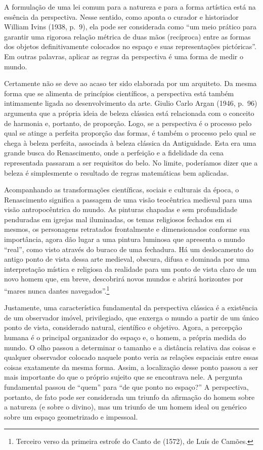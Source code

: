 A formulação de uma lei comum para a natureza e para a forma artística
está na essência da perspectiva. Nesse sentido, como aponta o curador e
historiador William Ivins (1938, p.~9), ela pode ser considerada como
``um meio prático para garantir uma rigorosa relação métrica de duas
mãos (recíproca) entre as formas dos objetos definitivamente colocados
no espaço e suas representações pictóricas''. Em outras palavras,
aplicar as regras da perspectiva é uma forma de medir o mundo.

Certamente não se deve ao acaso ter sido elaborada por um arquiteto. Da
mesma forma que se alimenta de princípios científicos, a perspectiva
está também intimamente ligada ao desenvolvimento da arte. Giulio Carlo
Argan (1946, p.~96) argumenta que a própria ideia de beleza clássica
está relacionada com o conceito de harmonia e, portanto, de proporção.
Logo, se a perspectiva é o processo pelo qual se atinge a perfeita
proporção das formas, é também o processo pelo qual se chega à beleza
perfeita, associada à beleza clássica da Antiguidade. Esta era uma
grande busca do Renascimento, onde a perfeição e a fidelidade da cena
representada passaram a ser requisitos do belo. No limite, poderíamos
dizer que a beleza é simplesmente o resultado de regras matemáticas bem
aplicadas.

Acompanhando as transformações científicas, sociais e culturais da
época, o Renascimento significa a passagem de uma visão teocêntrica
medieval para uma visão antropocêntrica do mundo. As pinturas chapadas e
sem profundidade penduradas em igrejas mal iluminadas, os temas
religiosos fechados em si mesmos, os personagens retratados frontalmente
e dimensionados conforme sua importância, agora dão lugar a uma pintura
luminosa que apresenta o mundo ``real'', como visto através do buraco de
uma fechadura. Há um deslocamento do antigo ponto de vista dessa arte
medieval, obscura, difusa e dominada por uma interpretação mística e
religiosa da realidade para um ponto de vista claro de um novo homem
que, em breve, descobrirá novos mundos e abrirá horizontes por ``mares
nunca dantes navegados''.\footnote{Terceiro verso da primeira estrofe
  do Canto  de {} (1572), de Luís de Camões.}

Justamente, uma característica fundamental da perspectiva clássica é a
existência de um observador imóvel, privilegiado, que enxerga o mundo a
partir de um único ponto de vista, considerado natural, científico e
objetivo. Agora, a percepção humana é o principal organizador do espaço
e, o homem, a própria medida do mundo. O olho passou a determinar o
tamanho e a distância relativa das coisas e qualquer observador colocado
naquele ponto veria as relações espaciais entre essas coisas exatamente
da mesma forma. Assim, a localização desse ponto passou a ser mais
importante do que o próprio sujeito que se encontrava nele. A pergunta
fundamental passou de ``quem'' para ``de que ponto no espaço?'' A
perspectiva, portanto, de fato pode ser considerada um triunfo da
afirmação do homem sobre a natureza (e sobre o divino), mas um triunfo
de um homem ideal ou genérico sobre um espaço geometrizado e impessoal.

